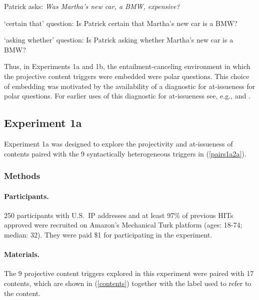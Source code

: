 \documentclass[11pt,fleqn]{article}
\newcommand{\6}{\mbox{$[\hspace*{-.6mm}[$}}
\newcommand{\9}{\mbox{$]\hspace*{-.6mm}]$}}
\begin{document}
\begin{exe}

\ex\label{stim} Patrick asks: {\em Was Martha's new car, a BMW, expensive?} 

\begin{xlist}
\ex `certain that' question: Is Patrick certain that Martha's new car is a BMW?

\ex `asking whether' question: Is Patrick asking whether Martha's new car is a BMW?

\end{xlist}

\end{exe}
Thus, in Experiments 1a and 1b, the entailment-canceling environment in which the projective content triggers were embedded were polar questions. This choice of embedding was motivated by the availability of a diagnostic for at-issueness for polar questions. For earlier uses of this diagnostic for at-issueness see, e.g., \citealt[731]{amaral-etal07} and \citealt{tonhauser-sula6}.

\subsection{Experiment 1a} 

Experiment 1a was designed to explore the projectivity and at-issueness of contents paired with the 9 syntactically heterogeneous triggers in (\ref{pairs1a2a}).

\subsubsection{Methods}\label{s-methods-1a}

\paragraph{Participants.} 250 participants with U.S.\ IP addresses and at least 97\% of previous HITs approved were recruited on Amazon's Mechanical Turk platform (ages: 18-74; median: 32). They were paid \$1 for participating in the experiment. 

\paragraph{Materials.} The 9 projective content triggers explored in this experiment were paired with 17 contents, which are shown in (\ref{contents}) together with the label used to refer to the content.
\end{document}
